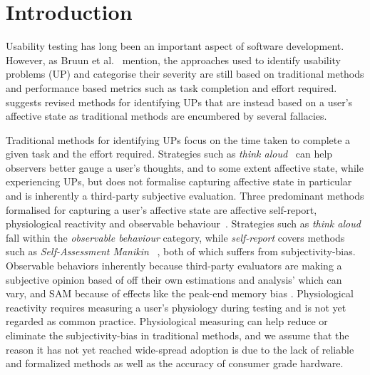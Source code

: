 	
\section{Introduction}

Usability testing has long been an important aspect of software development.
However, as Bruun et al.~\cite{LH-paper} mention, the approaches used to
identify usability problems (UP) and categorise their severity are still based
on traditional methods and performance based metrics such as task completion and effort required. \cite{LH-paper} suggests revised methods
for identifying UPs that are instead based on a user's affective state as
traditional methods are encumbered by several fallacies.


Traditional methods for identifying UPs focus on the time taken to complete a
given task and the effort required. Strategies such as \textit{think
aloud}~\cite{use_of_TA_and_IDA} can help observers better gauge a user's
thoughts, and to some extent affective state, while experiencing UPs, but does
not formalise capturing affective state in particular and is inherently a third-party
subjective evaluation. Three predominant methods formalised for capturing a
user's affective state are affective self-report, physiological reactivity and
observable behaviour~\cite{BRADLEY199449}. Strategies such as \textit{think
aloud} fall within the \textit{observable behaviour} category, while
\textit{self-report} covers methods such as \textit{Self-Assessment Manikin}
~\cite{BRADLEY199449}, both of which suffers from 
subjectivity-bias. Observable behaviors inherently because third-party evaluators are making a subjective opinion based of off their own estimations and analysis' which can vary\cite{eval_effect}, and SAM because of effects like the peak-end memory bias \cite{cockburn_peakend}. Physiological reactivity requires measuring a
user's physiology during testing and is not yet regarded as common practice\cite{9th_semester_project}.  Physiological measuring can help reduce or
eliminate the subjectivity-bias in traditional methods, and we assume that
the reason it has not yet reached wide-spread adoption is due to the lack of
reliable and formalized methods as well as the accuracy of consumer grade hardware.

